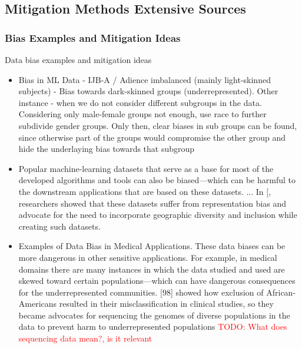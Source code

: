 \documentclass[12pt, a4paper, oneside]{book}   	%
\renewcommand{\todo}[1]{\textcolor{red}{TODO: #1}}
\renewcommand{\paragraph}[1]{%
	\subsubsection*{#1}%
}
\newif\ifrawcitationactive
\newcommand{\rawcitationstart}{
	\color{purple}\rawcitationactivetrue
}
\newcommand{\rawcitationusedstart}{\color{violet}}
\newcommand{\rawcitationusedend}{%
	\ifrawcitationactive
	\color{purple}  %
	\else
	\color{black}  %
	\fi
}
\begin{document}
			
		\rawcitationstart
		\subsection{Mitigation Methods Extensive Sources}
			
			\paragraph{Bias Examples and Mitigation Ideas}
			Data bias examples and mitigation ideas
			\begin{itemize}
				\item Bias in \gls{ML} Data - \autocite{M24_Buolamwini_2018} IJB-A / Adience imbalanced (mainly light-skinned subjects) - Bias towards dark-skinned groups (underrepresented). Other instance - when we do not consider different subgroups in the data. Considering only male-female groups not enough, use race to further subdivide gender groups. Only then, clear biases in sub groups can be found, since otherwise part of the groups would  compromise the other group and hide the underlaying bias towards that subgroup \autocite{Mehrabi_2021}
				\rawcitationusedstart
				\item Popular machine-learning datasets that serve as a base for most of the developed algorithms and tools can also be biased—which can be harmful to the downstream applications that are based on these datasets. ... In [\autocite{M142_Shankar_2017}, researchers showed that these datasets suffer from representation bias and advocate for the need to incorporate geographic diversity and inclusion while creating such datasets. \autocite{Mehrabi_2021}
				\rawcitationusedend
				\item Examples of Data Bias in Medical Applications. These data biases can be more dangerous in other sensitive applications. For example, in medical domains there are many instances in which the data studied and used are skewed toward certain populations—which can have dangerous consequences for the underrepresented communities. [98] showed how exclusion of African-Americans resulted in their misclassification in clinical studies, so they became advocates for sequencing the genomes of diverse populations in the data to prevent harm to underrepresented populations \autocite{Mehrabi_2021} \todo{What does sequencing data mean?, is it relevant}
			\end{itemize}
			
\end{document}
